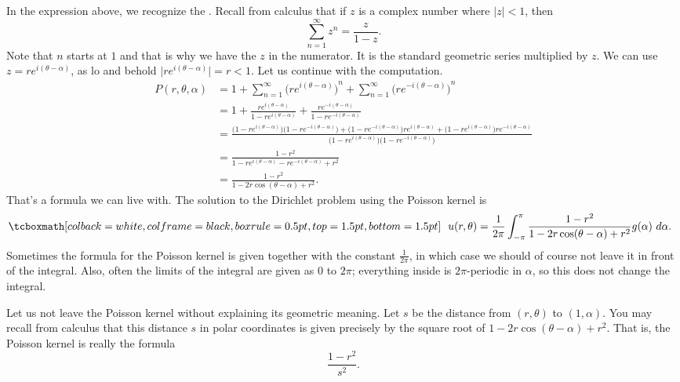 In the expression above, we recognize the
\emph{}.
Recall from calculus that if $z$ is a complex number where $\lvert z \rvert < 1$, then
\begin{equation*}
\sum_{n=1}^\infty z^n = \frac{z}{1-z} .
\end{equation*}
Note that $n$ starts at $1$ and that is why we have the $z$ in the numerator.
It is the standard geometric series multiplied by $z$.
We can use $z = re^{i(\theta-\alpha)}$, as
lo and behold $\lvert re^{i(\theta-\alpha)} \rvert = r < 1$.
Let us
continue with the computation.
\begin{equation*}
\begin{split}
P(r,\theta,\alpha)
& =
1
+
\sum_{n=1}^\infty
{\bigl(
re^{i(\theta-\alpha)}\bigr)}^{n}
+
\sum_{n=1}^\infty
{\bigl(
re^{-i(\theta-\alpha)}\bigr)}^{n}
\\
& =
1
+
\frac{re^{i(\theta-\alpha)}}{1-re^{i(\theta-\alpha)}}
+
\frac{re^{-i(\theta-\alpha)}}{1-re^{-i(\theta-\alpha)}}
\\
& = 
\frac{
\bigl(1-re^{i(\theta-\alpha)}\bigr)\bigl(1-re^{-i(\theta-\alpha)}\bigr)
+
\bigl(1-re^{-i(\theta-\alpha)}\bigr)re^{i(\theta-\alpha)} +
\bigl(1-re^{i(\theta-\alpha)}\bigr)re^{-i(\theta-\alpha)}}
{\bigl(1-re^{i(\theta-\alpha)}\bigr)\bigl(1-re^{-i(\theta-\alpha)}\bigr)}
\\
& = 
\frac{1 -r^2}{1 - re^{i(\theta-\alpha)} - re^{-i(\theta-\alpha)} +r^2}
\\
& = 
\frac{1 -r^2}{1 - 2r\cos(\theta-\alpha) +r^2} .
\end{split}
\end{equation*}
That's a formula we can live with.  The
solution to the Dirichlet problem using the Poisson kernel is
\begin{equation*}
\mybxbg{~~
u(r,\theta) = 
\frac{1}{2\pi} \int_{-\pi}^{\pi}
\frac{1 -r^2}{1 - 2r\cos(\theta-\alpha) +r^2} g(\alpha) ~ d\alpha .
~~}
\end{equation*}
Sometimes the formula for the Poisson kernel is
given together with the constant $\frac{1}{2\pi}$, in which case we should
of course not leave it in front of the integral.
Also, often the limits
of the integral are given as 0 to $2\pi$; everything inside is
$2\pi$-periodic in $\alpha$, so this does not change the integral.

\begin{mywrapfigsimp}[12]{2.1in}{2.4in}
\diffypdfversion{\vspace*{5pt}}
\noindent
{}
\end{mywrapfigsimp}
Let us not leave the Poisson kernel without explaining its geometric
meaning.  Let $s$ be the distance from $(r,\theta)$ to
$(1,\alpha)$.
You may recall from calculus that
this distance $s$ in polar coordinates is given precisely by the square root
of $1 - 2r\cos(\theta-\alpha) +r^2$.  That is, the Poisson kernel is really
the formula
\begin{equation*}
\frac{1-r^2}{s^2} .
\end{equation*}

